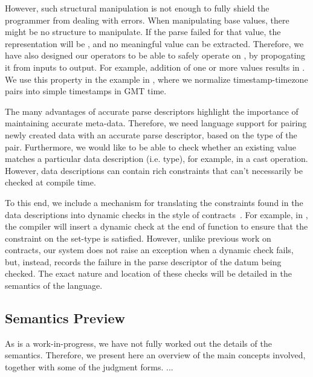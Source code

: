 \documentclass{entcs}
\begin{document}
However, such structural manipulation is not enough to fully shield
the programmer from dealing with errors. When manipulating base
values, there might be no structure to manipulate. If the parse failed
for that value, the representation will be \btm{}, and no meaningful
value can be extracted. Therefore, we have also designed our operators
to be able to safely operate on \btm{}, by propogating it from inputs
to output. For example, addition of one or more \btm{} values results
in \btm{}. We use this property in the example in
, where we normalize timestamp-timezone pairs
into simple timestamps in GMT time.

The many advantages of accurate parse descriptors highlight the
importance of maintaining accurate meta-data. Therefore, we need
language support for pairing newly created data with an accurate parse
descriptor, based on the type of the pair. Furthermore, we would like
to be able to check whether an existing value matches a particular
data description (i.e. type), for example, in a cast operation.
However, data descriptions can contain rich constraints that can't
necessarily be checked at compile time.

To this end, we include a mechanism for translating the constraints
found in the data descriptions into dynamic checks in the style of
contracts~\cite{contracts}. For example, in
, the compiler will insert a dynamic check
at the end of function  to ensure that the constraint
on the set-type is satisfied. However, unlike previous work on
contracts, our system does not raise an exception when a dynamic check
fails, but, instead, records the failure in the parse descriptor of
the datum being checked.  The exact nature and location of these
checks will be detailed in the semantics of the language.

\subsection{Semantics Preview}

As \datatype{} is a work-in-progress, we have not fully worked out the
details of the semantics.  Therefore, we present here an overview of
the main concepts involved, together with some of the judgment forms.
...

\end{document}
